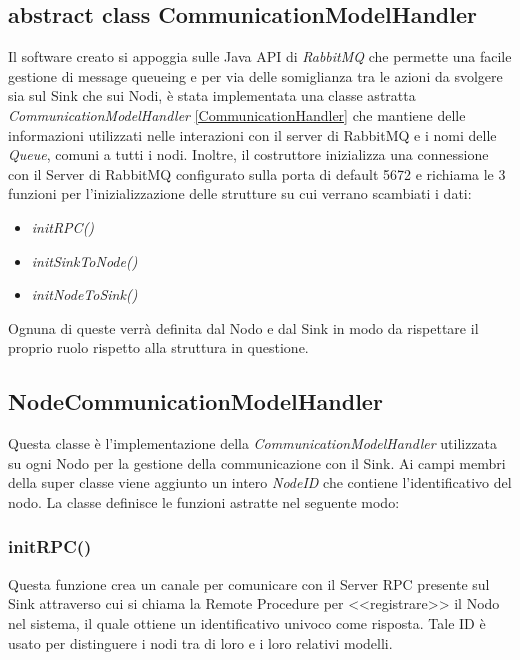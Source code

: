     \subsection{abstract class CommunicationModelHandler}
      Il software creato si appoggia sulle Java API di \textit{RabbitMQ} che permette una facile gestione di message queueing e per via delle somiglianza tra le azioni da svolgere sia sul Sink che sui Nodi, è stata implementata una classe astratta \textit{CommunicationModelHandler} \ref{CommunicationHandler} che mantiene delle informazioni utilizzati nelle interazioni con il server di RabbitMQ e i nomi delle \textit{Queue}, comuni a tutti i nodi. Inoltre, il costruttore inizializza una connessione con il Server di RabbitMQ configurato sulla porta di default 5672 e richiama le 3 funzioni per l'inizializzazione delle strutture su cui verrano scambiati i dati:
      \begin{itemize}
        \item \textit{initRPC()}
        \item \textit{initSinkToNode()}
        \item \textit{initNodeToSink()}
      \end{itemize}
      Ognuna di queste verrà definita dal Nodo e dal Sink in modo da rispettare il proprio ruolo rispetto alla struttura in questione.
      

    \subsection{NodeCommunicationModelHandler}
      Questa classe è l'implementazione della \textit{CommunicationModelHandler} utilizzata su ogni Nodo per la gestione della communicazione con il Sink. Ai campi membri della super classe viene aggiunto un intero \textit{NodeID} che contiene l'identificativo del nodo. La classe definisce le funzioni astratte nel seguente modo:
      \subsubsection{initRPC()}
        Questa funzione crea un canale per comunicare con il Server RPC presente sul Sink attraverso cui si chiama la Remote Procedure per <<registrare>> il Nodo nel sistema, il quale ottiene un identificativo univoco come risposta. Tale ID è usato per distinguere i nodi tra di loro e i loro relativi modelli.
        

